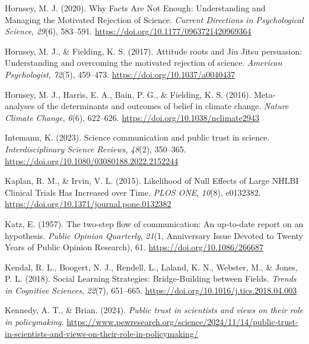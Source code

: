 \documentclass[
  man,
  floatsintext,
  longtable,
  nolmodern,
  notxfonts,
  notimes,
  colorlinks=true,linkcolor=blue,citecolor=blue,urlcolor=blue]{apa7}
\newlength{\cslhangindent}
\newenvironment{CSLReferences}[2] %
 {\begin{list}{}{%
  \setlength{\itemindent}{0pt}
  \setlength{\leftmargin}{0pt}
  \setlength{\parsep}{0pt}
  \ifodd #1
   \setlength{\leftmargin}{\cslhangindent}
   \setlength{\itemindent}{-1\cslhangindent}
  \fi
  \setlength{\itemsep}{#2\baselineskip}}}
 {\end{list}}
\begin{document}
\begin{CSLReferences}{1}{0}
Hornsey, M. J. (2020). Why Facts Are Not Enough: Understanding and
Managing the Motivated Rejection of Science. \emph{Current Directions in
Psychological Science}, \emph{29}(6), 583--591.
\url{https://doi.org/10.1177/0963721420969364}

Hornsey, M. J., \& Fielding, K. S. (2017). Attitude roots and Jiu Jitsu
persuasion: Understanding and overcoming the motivated rejection of
science. \emph{American Psychologist}, \emph{72}(5), 459--473.
\url{https://doi.org/10.1037/a0040437}

Hornsey, M. J., Harris, E. A., Bain, P. G., \& Fielding, K. S. (2016).
Meta-analyses of the determinants and outcomes of belief in climate
change. \emph{Nature Climate Change}, \emph{6}(6), 622--626.
\url{https://doi.org/10.1038/nclimate2943}

Intemann, K. (2023). Science communication and public trust in science.
\emph{Interdisciplinary Science Reviews}, \emph{48}(2), 350--365.
\url{https://doi.org/10.1080/03080188.2022.2152244}

Kaplan, R. M., \& Irvin, V. L. (2015). Likelihood of Null Effects of
Large NHLBI Clinical Trials Has Increased over Time. \emph{PLOS ONE},
\emph{10}(8), e0132382.
\url{https://doi.org/10.1371/journal.pone.0132382}

Katz, E. (1957). The two-step flow of communication: An up-to-date
report on an hypothesis. \emph{Public Opinion Quarterly}, \emph{21}(1,
Anniversary Issue Devoted to Twenty Years of Public Opinion Research),
61. \url{https://doi.org/10.1086/266687}

Kendal, R. L., Boogert, N. J., Rendell, L., Laland, K. N., Webster, M.,
\& Jones, P. L. (2018). Social Learning Strategies: Bridge-Building
between Fields. \emph{Trends in Cognitive Sciences}, \emph{22}(7),
651--665. \url{https://doi.org/10.1016/j.tics.2018.04.003}

Kennedy, A. T., \& Brian. (2024). \emph{Public trust in scientists and
views on their role in policymaking}.
\url{https://www.pewresearch.org/science/2024/11/14/public-trust-in-scientists-and-views-on-their-role-in-policymaking/}


\end{CSLReferences}
\end{document}
